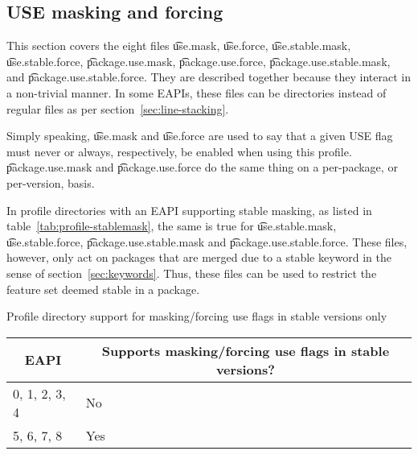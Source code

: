 \subsection{USE masking and forcing}
\label{sec:use-masking}
This section covers the eight files \t{use.mask}, \t{use.force}, \t{use.stable.mask},
\t{use.stable.force}, \t{package.use.mask}, \t{package.use.force}, \t{package.use.stable.mask},
and \t{package.use.\allowbreak stable.force}. They are described together because they interact in
a non-trivial manner. In some EAPIs, these files can be directories instead of regular files as per
section~\ref{sec:line-stacking}.

Simply speaking, \t{use.mask} and \t{use.force} are used to say that a given USE flag must never or
always, respectively, be enabled when using this profile. \t{package.use.mask} and
\t{package.use.force} do the same thing on a per-package, or per-version, basis.

In profile directories with an EAPI supporting stable masking, as listed in
table~\ref{tab:profile-stablemask}, the same is true for \t{use.stable.mask}, \t{use.stable.force},
\t{package.use.stable.mask} and \t{package.use.\allowbreak stable.force}. These files, however,
only act on packages that are merged due to a stable keyword in the sense of
section~\ref{sec:keywords}. Thus, these files can be used to restrict the feature set deemed
stable in a package.

\begin{centertable}{Profile directory support for masking/forcing use flags in stable versions only}
    \label{tab:profile-stablemask}
    \begin{tabular}{ll}
      \toprule
      \multicolumn{1}{c}{\textbf{EAPI}} &
      \multicolumn{1}{c}{\textbf{Supports masking/forcing use flags in stable versions?}} \\
      \midrule
      0, 1, 2, 3, 4     & No  \\
      5, 6, 7, 8        & Yes \\
      \bottomrule
    \end{tabular}
\end{centertable}

